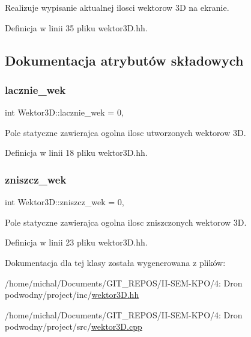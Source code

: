 Realizuje wypisanie aktualnej ilosci wektorow 3D na ekranie. 



Definicja w linii 35 pliku wektor3\+D.\+hh.



\subsection{Dokumentacja atrybutów składowych}
\mbox{\label{class_wektor3_d_a0e760007c5a0cb91ddc981879191212a}} 
\subsubsection{\texorpdfstring{lacznie\+\_\+wek}{lacznie\_wek}}
{\footnotesize\ttfamily int Wektor3\+D\+::lacznie\+\_\+wek = 0\hspace{0.3cm}{\ttfamily [static]}, {\ttfamily [private]}}



Pole statyczne zawierajca ogolna ilosc utworzonych wektorow 3D. 



Definicja w linii 18 pliku wektor3\+D.\+hh.

\mbox{\label{class_wektor3_d_a3977f6ad24d6653c8b22feaf69bc3ed2}} 
\subsubsection{\texorpdfstring{zniszcz\+\_\+wek}{zniszcz\_wek}}
{\footnotesize\ttfamily int Wektor3\+D\+::zniszcz\+\_\+wek = 0\hspace{0.3cm}{\ttfamily [static]}, {\ttfamily [private]}}



Pole statyczne zawierajca ogolna ilosc zniszczonych wektorow 3D. 



Definicja w linii 23 pliku wektor3\+D.\+hh.



Dokumentacja dla tej klasy została wygenerowana z plików\+:\begin{DoxyCompactItemize}
\item 
/home/michal/\+Documents/\+G\+I\+T\+\_\+\+R\+E\+P\+O\+S/\+I\+I-\/\+S\+E\+M-\/\+K\+P\+O/4\+: Dron podwodny/project/inc/\hyperlink{wektor3_d_8hh}{wektor3\+D.\+hh}\item 
/home/michal/\+Documents/\+G\+I\+T\+\_\+\+R\+E\+P\+O\+S/\+I\+I-\/\+S\+E\+M-\/\+K\+P\+O/4\+: Dron podwodny/project/src/\hyperlink{wektor3_d_8cpp}{wektor3\+D.\+cpp}\end{DoxyCompactItemize}
